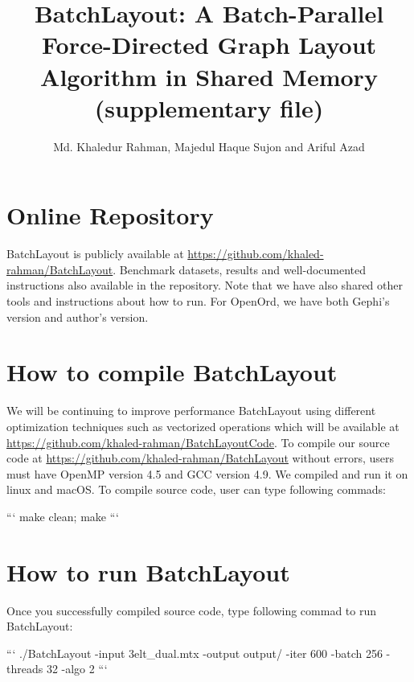 \documentclass[conference]{article}
\date{}
\newcommand{\toolname}{{BatchLayout}}
\begin{document}
\setcounter{page}{1}
\title{BatchLayout: A Batch-Parallel Force-Directed Graph Layout Algorithm in Shared Memory\\ (supplementary file)}
\author{Md. Khaledur Rahman, Majedul Haque Sujon and Ariful Azad}
\maketitle
\section{Online Repository}
\toolname{} is publicly available at \url{https://github.com/khaled-rahman/BatchLayout}. Benchmark datasets, results and well-documented instructions also available in the repository. Note that we have also shared other tools and instructions about how to run. For OpenOrd, we have both Gephi's version and author's version.

\section{How to compile \toolname{}}
We will be continuing to improve performance \toolname{} using different optimization techniques such as vectorized operations which will be available at \url{https://github.com/khaled-rahman/BatchLayoutCode}. To compile our source code at \url{https://github.com/khaled-rahman/BatchLayout} without errors, users must have OpenMP version 4.5 and GCC version 4.9. We compiled and run it on linux and macOS. To compile source code, user can type following commads:\newline
\begin{markdown}
```
make clean;
make
```
\end{markdown}

\section{How to run \toolname{}}
Once you successfully compiled source code, type following commad to run \toolname{}:\newline
\begin{markdown}
```
./BatchLayout -input 3elt_dual.mtx -output output/ -iter 600 -batch 256 -threads 32 -algo 2
```
\end{markdown}
\end{document}

